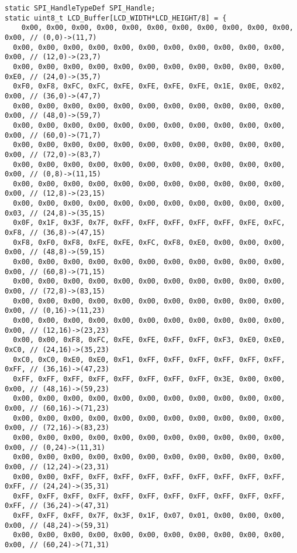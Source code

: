 \documentclass[oneside,14pt]{extarticle}
\begin{document}
\begin{normalsize}
{\begin{lstlisting}
static SPI_HandleTypeDef SPI_Handle;
static uint8_t LCD_Buffer[LCD_WIDTH*LCD_HEIGHT/8] = {
	0x00, 0x00, 0x00, 0x00, 0x00, 0x00, 0x00, 0x00, 0x00, 0x00, 0x00, 0x00, // (0,0)->(11,7)
  0x00, 0x00, 0x00, 0x00, 0x00, 0x00, 0x00, 0x00, 0x00, 0x00, 0x00, 0x00, // (12,0)->(23,7)
  0x00, 0x00, 0x00, 0x00, 0x00, 0x00, 0x00, 0x00, 0x00, 0x00, 0x00, 0xE0, // (24,0)->(35,7)
  0xF0, 0xF8, 0xFC, 0xFC, 0xFE, 0xFE, 0xFE, 0xFE, 0x1E, 0x0E, 0x02, 0x00, // (36,0)->(47,7)
  0x00, 0x00, 0x00, 0x00, 0x00, 0x00, 0x00, 0x00, 0x00, 0x00, 0x00, 0x00, // (48,0)->(59,7)
  0x00, 0x00, 0x00, 0x00, 0x00, 0x00, 0x00, 0x00, 0x00, 0x00, 0x00, 0x00, // (60,0)->(71,7)
  0x00, 0x00, 0x00, 0x00, 0x00, 0x00, 0x00, 0x00, 0x00, 0x00, 0x00, 0x00, // (72,0)->(83,7)
  0x00, 0x00, 0x00, 0x00, 0x00, 0x00, 0x00, 0x00, 0x00, 0x00, 0x00, 0x00, // (0,8)->(11,15)
  0x00, 0x00, 0x00, 0x00, 0x00, 0x00, 0x00, 0x00, 0x00, 0x00, 0x00, 0x00, // (12,8)->(23,15)
  0x00, 0x00, 0x00, 0x00, 0x00, 0x00, 0x00, 0x00, 0x00, 0x00, 0x00, 0x03, // (24,8)->(35,15)
  0x0F, 0x1F, 0x3F, 0x7F, 0xFF, 0xFF, 0xFF, 0xFF, 0xFF, 0xFE, 0xFC, 0xF8, // (36,8)->(47,15)
  0xF8, 0xF0, 0xF8, 0xFE, 0xFE, 0xFC, 0xF8, 0xE0, 0x00, 0x00, 0x00, 0x00, // (48,8)->(59,15)
  0x00, 0x00, 0x00, 0x00, 0x00, 0x00, 0x00, 0x00, 0x00, 0x00, 0x00, 0x00, // (60,8)->(71,15)
  0x00, 0x00, 0x00, 0x00, 0x00, 0x00, 0x00, 0x00, 0x00, 0x00, 0x00, 0x00, // (72,8)->(83,15)
  0x00, 0x00, 0x00, 0x00, 0x00, 0x00, 0x00, 0x00, 0x00, 0x00, 0x00, 0x00, // (0,16)->(11,23)
  0x00, 0x00, 0x00, 0x00, 0x00, 0x00, 0x00, 0x00, 0x00, 0x00, 0x00, 0x00, // (12,16)->(23,23)
  0x00, 0x00, 0xF8, 0xFC, 0xFE, 0xFE, 0xFF, 0xFF, 0xF3, 0xE0, 0xE0, 0xC0, // (24,16)->(35,23)
  0xC0, 0xC0, 0xE0, 0xE0, 0xF1, 0xFF, 0xFF, 0xFF, 0xFF, 0xFF, 0xFF, 0xFF, // (36,16)->(47,23)
  0xFF, 0xFF, 0xFF, 0xFF, 0xFF, 0xFF, 0xFF, 0xFF, 0x3E, 0x00, 0x00, 0x00, // (48,16)->(59,23)
  0x00, 0x00, 0x00, 0x00, 0x00, 0x00, 0x00, 0x00, 0x00, 0x00, 0x00, 0x00, // (60,16)->(71,23)
  0x00, 0x00, 0x00, 0x00, 0x00, 0x00, 0x00, 0x00, 0x00, 0x00, 0x00, 0x00, // (72,16)->(83,23)
  0x00, 0x00, 0x00, 0x00, 0x00, 0x00, 0x00, 0x00, 0x00, 0x00, 0x00, 0x00, // (0,24)->(11,31)
  0x00, 0x00, 0x00, 0x00, 0x00, 0x00, 0x00, 0x00, 0x00, 0x00, 0x00, 0x00, // (12,24)->(23,31)
  0x00, 0x00, 0xFF, 0xFF, 0xFF, 0xFF, 0xFF, 0xFF, 0xFF, 0xFF, 0xFF, 0xFF, // (24,24)->(35,31)
  0xFF, 0xFF, 0xFF, 0xFF, 0xFF, 0xFF, 0xFF, 0xFF, 0xFF, 0xFF, 0xFF, 0xFF, // (36,24)->(47,31)
  0xFF, 0xFF, 0xFF, 0x7F, 0x3F, 0x1F, 0x07, 0x01, 0x00, 0x00, 0x00, 0x00, // (48,24)->(59,31)
  0x00, 0x00, 0x00, 0x00, 0x00, 0x00, 0x00, 0x00, 0x00, 0x00, 0x00, 0x00, // (60,24)->(71,31)

\end{lstlisting}}
\end{normalsize}
\end{document}
